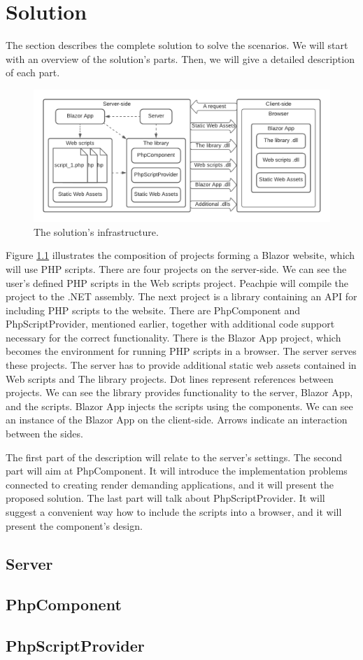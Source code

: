 \chapter{Solution}

The section describes the complete solution to solve the scenarios.
We will start with an overview of the solution's parts.
Then, we will give a detailed description of each part.
\par
\begin{figure}[H]\centering
\includegraphics[scale=0.7]{./img/SolutionInfrastructure}
\caption{The solution's infrastructure.}
\label{img03:infrastructure}
\end{figure} 
\par
Figure \ref{img03:infrastructure} illustrates the composition of projects forming a Blazor website, which will use PHP scripts.
There are four projects on the server-side.
We can see the user's defined PHP scripts in the Web scripts project.
Peachpie will compile the project to the .NET assembly.
The next project is a library containing an API for including PHP scripts to the website.
There are PhpComponent and PhpScriptProvider, mentioned earlier, together with additional code support necessary for the correct functionality.
There is the Blazor App project, which becomes the environment for running PHP scripts in a browser.
The server serves these projects.
The server has to provide additional static web assets contained in Web scripts and The library projects.
Dot lines represent references between projects.
We can see the library provides functionality to the server, Blazor App, and the scripts.
Blazor App injects the scripts using the components.
We can see an instance of the Blazor App on the client-side.
Arrows indicate an interaction between the sides. 
\par
The first part of the description will relate to the server's settings.
The second part will aim at PhpComponent.
It will introduce the implementation problems connected to creating render demanding applications, and it will present the proposed solution.
The last part will talk about PhpScriptProvider.
It will suggest a convenient way how to include the scripts into a browser, and it will present the component's design.
\par
\section{Server}
\section{PhpComponent}
\section{PhpScriptProvider}